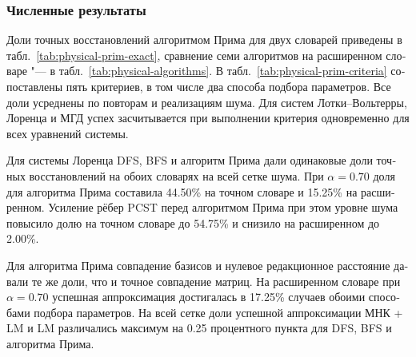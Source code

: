 \documentclass[12pt]{article}
\newif\ifhighlight \highlighttrue
\newenvironment{ru}{\begin{otherlanguage}{russian}\ifhighlight\color{blue}\fi}{\end{otherlanguage}}
\begin{document}
\clearpage
\begin{ru}
\subsubsection{Численные результаты}
Доли точных восстановлений алгоритмом Прима для двух словарей приведены в табл.~\ref{tab:physical-prim-exact}, сравнение семи алгоритмов на расширенном словаре "--- в табл.~\ref{tab:physical-algorithms}. В табл.~\ref{tab:physical-prim-criteria} сопоставлены пять критериев, в том числе два способа подбора параметров. Все доли усреднены по повторам и реализациям шума. Для систем Лотки--Вольтерры, Лоренца и МГД успех засчитывается при выполнении критерия одновременно для всех уравнений системы.

Для системы Лоренца DFS, BFS и алгоритм Прима дали одинаковые доли точных восстановлений на обоих словарях на всей сетке шума. При $\alpha=0.70$ доля для алгоритма Прима составила 44.50\% на точном словаре и 15.25\% на расширенном. Усиление рёбер PCST перед алгоритмом Прима при этом уровне шума повысило долю на точном словаре до 54.75\% и снизило на расширенном до 2.00\%.

Для алгоритма Прима совпадение базисов и нулевое редакционное расстояние давали те же доли, что и точное совпадение матриц. На расширенном словаре при $\alpha=0.70$ успешная аппроксимация достигалась в 17.25\% случаев обоими способами подбора параметров. На всей сетке доли успешной аппроксимации МНК + LM и LM различались максимум на 0.25 процентного пункта для DFS, BFS и алгоритма Прима.
\end{ru}
\end{document}
